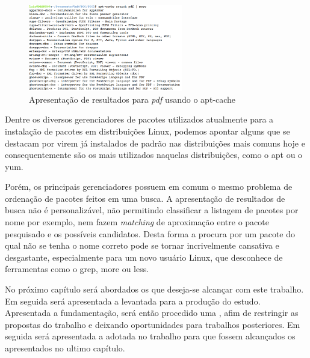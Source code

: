 \begin{figure}[h]
  \centering
	\includegraphics[width=0.6\textwidth]{figuras/search_pdf}
  \caption{Apresentação de resultados para \textit{pdf} usando o {\code apt-cache}}
  \label{fig:figuras_search_pdf}
\end{figure}

Dentre os diversos gerenciadores de pacotes utilizados atualmente para a instalação de pacotes em distribuições Linux, podemos apontar alguns que se destacam por virem já instalados de padrão nas distribuições mais comuns hoje e consequentemente são os mais  utilizados naquelas distribuições, como o {\code apt} ou o {\code yum}.

Porém, os principais gerenciadores possuem em comum o mesmo problema de ordenação de pacotes feitos em uma busca. A apresentação de resultados de busca não é personalizável, não permitindo classificar a listagem de pacotes por nome por exemplo, nem fazem \textit{matching} de aproximação  entre o pacote pesquisado e os possíveis candidatos. Desta forma a procura por um pacote do qual não se tenha o nome correto pode se tornar incrivelmente cansativa e desgastante, especialmente para um novo usuário Linux, que desconhece de ferramentas como o {\code grep, more} ou {\code  less}. 


No próximo capítulo será abordados os  que deseja-se alcançar com este trabalho. Em seguida será apresentada a  levantada para a produção do estudo. Apresentada a fundamentação, será então procedido uma , afim de restringir as propostas do trabalho e deixando oportunidades para trabalhos posteriores. Em seguida será apresentada a  adotada no trabalho para que fossem alcançados os  apresentados no ultimo capítulo.